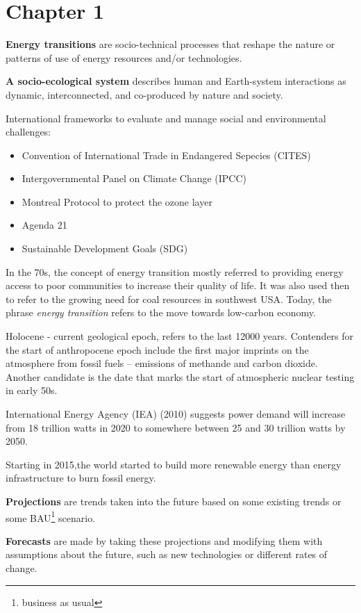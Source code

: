 \section{Chapter 1}

\textbf{Energy transitions} are socio-technical processes that reshape the
nature or patterns of use of energy resources and/or technologies.

\textbf{A socio-ecological system} describes human and Earth-system
interactions as dynamic, interconnected, and co-produced by nature and society.

International frameworks to evaluate and manage social and environmental
challenges:

\begin{itemize}
	\item Convention of International Trade in Endangered Sepecies (CITES)
	\item Intergovernmental Panel on Climate Change (IPCC)
	\item Montreal Protocol to protect the ozone layer
	\item Agenda 21
	\item Sustainable Development Goals (SDG)
\end{itemize}

In the 70s, the concept of energy transition mostly referred to providing
energy access to poor communities to increase their quality of life. It was
also used then to refer to the growing need for coal resources in southwest
USA. Today, the phrase \textit{energy transition} refers to the move towards
low-carbon economy.

Holocene - current geological epoch, refers to the last 12000 years. Contenders
for the start of anthropocene epoch include the first major imprints on the
atmosphere from fossil fuels -- emissions of methande and carbon dioxide.
Another candidate is the date that marks the start of atmospheric nuclear
testing in early 50s.

International Energy Agency (IEA) (2010) suggests power demand will increase
from 18 trillion watts in 2020 to somewhere between 25 and 30 trillion watts by
2050. 

Starting in 2015,the world started to build more renewable energy than energy
infrastructure to burn fossil energy.

\textbf{Projections} are trends taken into the future based on some existing
trends or some BAU\footnote{business as usual} scenario.

\textbf{Forecasts} are made by taking these projections and modifying them with
assumptions about the future, such as new technologies or different rates of
change.

